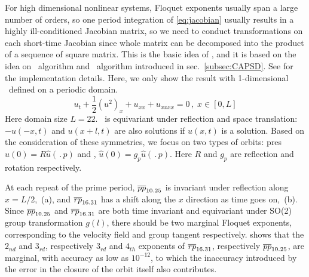 For high dimensional nonlinear systems, Floquet exponents usually span a large
number of orders, so one period integration of \eqref{eq:jacobian} usually
results in a highly ill-conditioned Jacobian matrix, so we need to conduct
transformations on each short-time Jacobian since whole matrix can be decomposed
into the product of a sequence of square matrix. This is the basic idea of
\emph{\ped}, and it is based on the idea on \cLv\ algorithm and
\psd\ algorithm introduced in sec.~\ref{subsec:CAPSD}. See
 for the implementation details. Here, we only show the result
with 1-dimensional \KSe\ defined on a periodic domain.
\begin{equation}
u_t+\frac{1}{2}(u^2)_x+u_{xx}+u_{xxxx}=0\,,\; x\in [0,L]
\label{eq:ks}
\end{equation}
Here domain size $L=22$.
\KSe\ is equivariant under reflection and space translation: $-u(-x,t)$ and
$u(x+l,t)$ are also solutions if $u(x,t)$ is a solution.
Based on the consideration of these symmetries,
we focus on two types of orbits:
pre\po s $\hat{u}(0)=R\hat{u}(\period{p})$  and \rpo,
$\hat{u}(0)=g_p\hat{u}(\period{p})$. Here $R$ and $g_p$ are reflection and
rotation respectively.

At each repeat of the prime period, ${\overline{pp}}_{10.25}$ is invariant
under reflection along $x=L/2$, \,(a), and
${\overline{rp}}_{16.31}$ has a shift along the $x$ direction as time goes on,
\,(b). Since ${\overline{pp}}_{10.25}$ and
${\overline{rp}}_{16.31}$ are both
time invariant and equivariant under SO(2) group transformation $g(l)$,
there should be two marginal Floquet exponents, corresponding to the
velocity field and group tangent respectively.
 shows that the $2_{nd}$ and $3_{rd}$,
respectively $3_{rd}$ and $4_{th}$ exponents of ${\overline{rp}}_{16.31}$,
respectively ${\overline{pp}}_{10.25}$, are marginal, with accuracy as low as
$10^{-12}$, to which the inaccuracy introduced by the error in the closure of
the orbit itself also contributes.


